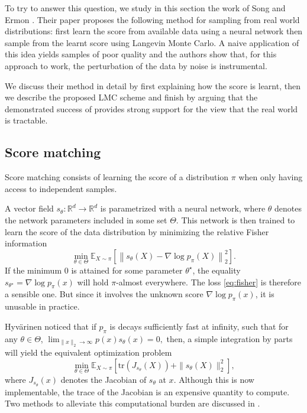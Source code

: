 \documentclass[10pt,journal,a4paper]{IEEEtran}
\theoremstyle{definition}
\newcommand{\E}{\mathbb{E}}
\newcommand{\R}{\mathbb{R}}
\begin{document}
To try to answer this question, we study in this section the work of Song and Ermon \cite{song_generative_2019}. Their paper proposes the following method for sampling from real world distributions:  first learn the score from available data using a neural network then sample from the learnt score using Langevin Monte Carlo. A naive application of this idea yields samples of poor quality and the authors show that, for this approach to work, the perturbation of the data by noise is instrumental.

We discuss their method in detail by first explaining how the score is learnt, then we describe the proposed LMC scheme and finish by arguing that the demonstrated success of \cite{song_generative_2019} provides strong support for the view that the real world is tractable.

\subsection{Score matching}

Score matching consists of learning the score of a distribution $\pi$ when only having access to independent samples.

A vector field $s_\theta: \R^d \rightarrow \R^d$ is parametrized with a neural network, where $\theta$ denotes the network parameters included in some set $\Theta$. This network is then trained to learn the score of the data distribution by minimizing the relative Fisher information 
\begin{equation}
\min_{\theta \in \Theta} \E_{X \sim \pi} \left[ \left\| s_\theta(X) - \nabla \log p_\pi(X) \right\|_2^2\right].
\label{eq:fisher}
\end{equation}
If the minimum $0$ is attained for some parameter $\theta^\star$, the equality $s_{\theta^\star} = \nabla \log p_\pi(x)$ will hold $\pi$-almost everywhere. The loss \eqref{eq:fisher} is therefore a sensible one. But since it involves the unknown score $\nabla \log p_\pi(x)$, it is unusable in practice.

Hyv\"arinen \cite{hyvarinen_estimation_2005} noticed that if $p_\pi$ is decays sufficiently fast at infinity, such that for any $\theta \in \Theta$,
\(
 \lim_{\|x\|_2 \rightarrow \infty} p(x)s_\theta(x) =0,
\)
then, a simple integration by parts will yield the equivalent optimization problem
\begin{equation}
\min_{\theta \in \Theta} \E_{X \sim \pi} \left[ \text{tr}(J_{s_\theta}(X)) + \|s_\theta(X)\|_2^2\right],
\label{eq:tractable-score}
\end{equation}
where $J_{s_\theta}(x)$ denotes the Jacobian of $s_\theta$ at $x$. Although this is now implementable, the trace of the Jacobian is an expensive quantity to compute. Two methods to alleviate this computational burden are discussed in \cite{song_generative_2019}.
\end{document}
